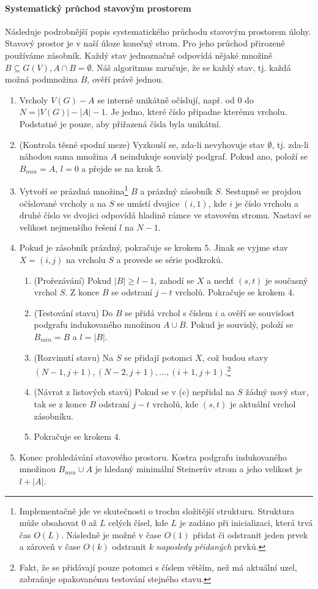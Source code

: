 \documentclass[12pt]{article}
\theoremstyle{definition}
\begin{document}
\paragraph{Systematický průchod stavovým prostorem}\mbox{}\newline
Následuje podrobnější popis systematického průchodu stavovým prostorem úlohy.
Stavový prostor je v naší úloze konečný strom. Pro jeho průchod přirozeně používáme
zásobník. Každý stav jednoznačně odpovídá nějaké množině $B\subseteq G(V), A\cap B = \emptyset$.
Náš algoritmus zaručuje, že se každý stav, tj. každá možná podmnožina $B$, ověří právě jednou.
\begin{enumerate}
	\item Vrcholy $V(G)-A$ se interně unikátně očíslují, např. od $0$ do $N=|V(G)|-|A|-1$. Je jedno,
	které číslo připadne kterému vrcholu. Podstatné je pouze, aby přiřazená čísla byla unikátní.
	\item (Kontrola těsné spodní meze) Vyzkouší se, zda-li nevyhovuje stav $\emptyset$, tj. zda-li
	náhodou sama množina $A$ neindukuje souvislý podgraf. Pokud ano, položí se $B_{min}=A$, $l=0$ a
	přejde se na krok $5$.
	\item Vytvoří se prázdná množina\footnote{Implementačně jde ve skutečnosti o trochu složitější strukturu.
		Struktura může obsahovat $0$ až $L$ celých čísel, kde $L$ je zadáno při inicializaci, která trvá čas $O(L)$. Následně
		je možné v čase $O(1)$ přidat či odstranit jeden prvek a zároveň v čase $O(k)$ odstranit $k$ \textit{naposledy přidaných} prvků.} $B$ a prázdný zásobník $S$. Sestupně se projdou očíslované
	vrcholy a na $S$ se umístí dvojice $(i, 1)$, kde $i$ je číslo vrcholu a druhé
	číslo ve dvojici odpovídá hladině rámce ve stavovém stromu. Nastaví se velikost nejmenšího řešení $l$ na $N-1$.
	\item Pokud je zásobník prázdný, pokračuje se krokem $5$. Jinak se vyjme stav $X = (i, j)$ na vrcholu $S$ a provede se série podkroků.
	\begin{enumerate}
		\item (Prořezávání) Pokud $|B| \geq l - 1$, zahodí se $X$ a nechť $(s, t)$ je současný vrchol $S$. Z konce $B$ se odstraní $j-t$ vrcholů. Pokračuje se krokem $4$.
		\item (Testování stavu) Do $B$ se přidá vrchol s číslem $i$ a ověří se souvislost podgrafu indukovaného množinou $A\cup B$. Pokud je souvislý, položí se $B_{min}=B$ a $l=|B|$.
		\item (Rozvinutí stavu) Na $S$ se přidají potomci $X$, což budou stavy $(N-1, j+1), (N-2, j+1),
		\dots, (i+1, j+1)$.\footnote{Fakt, že se přidávají pouze potomci s číslem větším, než má aktuální uzel, zabraňuje opakovanému testování stejného stavu.}
		\item (Návrat z listových stavů) Pokud se v (c) nepřidal na $S$ žádný nový stav, tak se z konce $B$ odstraní $j-t$ vrcholů, kde $(s, t)$ je aktuální vrchol zásobníku.
		\item Pokračuje se krokem 4.
	\end{enumerate}
	\item Konec prohledávání stavového prostoru. Kostra podgrafu indukovaného množinou $B_{min}\cup A$ je hledaný minimální Steinerův strom a jeho velikost je $l+|A|$.	
\end{enumerate}
\end{document}
